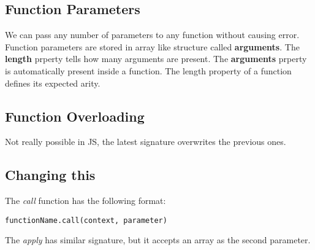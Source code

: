 \documentclass[12pt, a4paper]{article}
\begin{document}
\subsection{Function Parameters}
We can pass any number of parameters to any function without causing error.
Function parameters are stored in array like structure called \textbf{arguments}.
The \textbf{length} prperty tells how many arguments are present. 
The \textbf{arguments} prperty is automatically present inside a function.
The length property of a function defines its expected arity.
\subsection{Function Overloading}
Not really possible in JS, the latest signature overwrites the previous ones.
\subsection{Changing this}
The \emph{call} function has the following format:
\begin{verbatim}
functionName.call(context, parameter)
\end{verbatim}
The \emph{apply} has similar signature, but it accepts an array as the second parameter.
\end{document}
